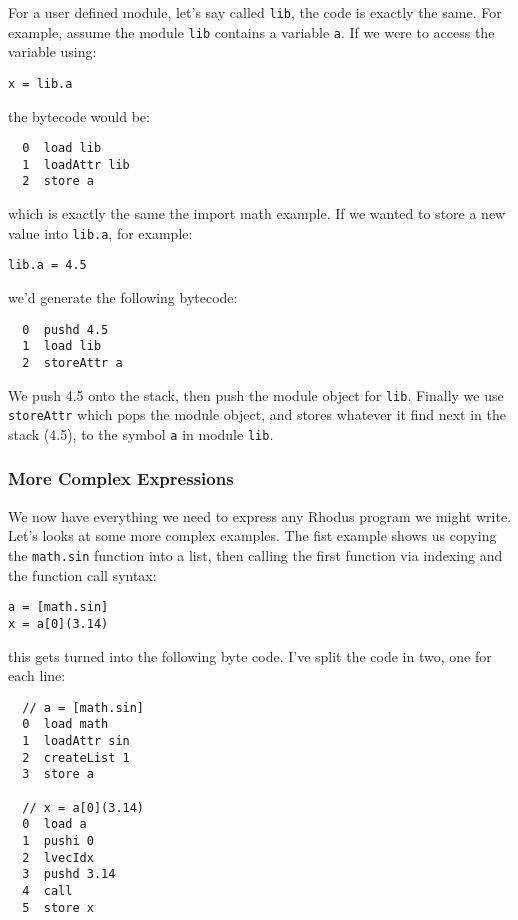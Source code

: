 For a user defined module, let's say called {\tt lib}, the code is exactly the same. For example, assume the module {\tt lib} contains a variable {\tt a}. If we were to access the variable using:

\begin{lstlisting}
x = lib.a
\end{lstlisting}

the bytecode would be:

\begin{lstlisting}
  0  load lib
  1  loadAttr lib
  2  store a
\end{lstlisting}

which is exactly the same the import math example.  If we wanted to store a new value into {\tt lib.a}, for example:

\begin{lstlisting}
lib.a = 4.5
\end{lstlisting}

we'd generate the following bytecode:

\begin{lstlisting}
  0  pushd 4.5
  1  load lib
  2  storeAttr a
\end{lstlisting}

We push 4.5 onto the stack, then push the module object for {\tt lib}. Finally we use {\tt storeAttr} which pops the module object, and stores whatever it find next in the stack (4.5), to the symbol {\tt a} in module {\tt lib}.

\subsubsection*{More Complex Expressions}

We now have everything we need to express any Rhodus program we might write. Let's looks at some more complex examples. The fist example shows us copying the {\tt math.sin} function into a list, then calling the first function via indexing and the function call syntax:

\begin{lstlisting}
a = [math.sin]
x = a[0](3.14)
\end{lstlisting}

this gets turned into the following byte code. I've split the code in two, one for each line:

\begin{lstlisting}
  // a = [math.sin]
  0  load math
  1  loadAttr sin
  2  createList 1
  3  store a

  // x = a[0](3.14)
  0  load a
  1  pushi 0
  2  lvecIdx
  3  pushd 3.14
  4  call
  5  store x
\end{lstlisting}

